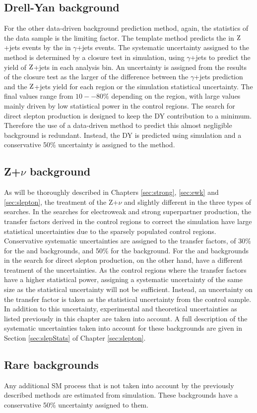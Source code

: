 \subsection*{Drell-Yan background}
\noindent\justify
For the other data-driven background prediction method, again, the statistics of the data sample is the limiting factor.
The \ptmiss template method predicts the \ptmiss in $\mathrm{Z}$+jets events by the \ptmiss in $\gamma$+jets events. 
The systematic uncertainty assigned to the method is determined by a closure test in simulation, using $\gamma$+jets to predict the yield of $\mathrm{Z}$+jets in each analysis bin. 
An uncertainty is assigned from the results of the closure test as the larger of the difference between the $\gamma$+jets prediction and the $\mathrm{Z}$+jets yield for each \ptmiss region or the simulation statistical uncertainty.  
The final values range from $10--80\%$ depending on the region, with large values mainly driven by low statistical power in the control regions.  
\newpara
\noindent\justify
The search for direct slepton production is designed to keep the DY contribution to a minimum. 
Therefore the use of a data-driven method to predict this almost negligible background is redundant. 
Instead, the DY is predicted using simulation and a conservative 50\% uncertainty is assigned to the method.  
\subsection*{Z+$\nu$ background}
\noindent\justify
As will be thoroughly described in Chapters \ref{sec:strong}, \ref{sec:ewk} and \ref{sec:slepton}, the treatment of the Z+$\nu$ and slightly different in the three types of searches. 
In the searches for electroweak and strong superpartner production, the transfer factors derived in the control regions to correct the simulation have large statistical uncertainties due to the sparsely populated control regions.
Conservative systematic uncertainties are assigned to the transfer factors, of 30\% for the \PWZ and \ttZ backgrounds, and 50\% for the \PZZ background.   
\newpara
\noindent\justify
For the \PWZ and \PZZ backgrounds in the search for direct slepton production, on the other hand, have a different treatment of the uncertainties. 
As the control regions where the transfer factors have a higher statistical power, assigning a systematic uncertainty of the same size as the statistical uncertainty will not be sufficient. 
Instead, an uncertainty on the transfer factor is taken as the statistical uncertainty from the control sample. 
In addition to this uncertainty, experimental and theoretical uncertainties as listed previously in this chapter are taken into account. 
A full description of the systematic uncertainties taken into account for these backgrounds are given in Section \ref{sec:slepStats} of Chapter \ref{sec:slepton}. 
\subsection*{Rare backgrounds}
\noindent\justify
Any additional SM process that is not taken into account by the previously described methods are estimated from simulation. 
These backgrounds have a conservative 50\% uncertainty assigned to them. 
